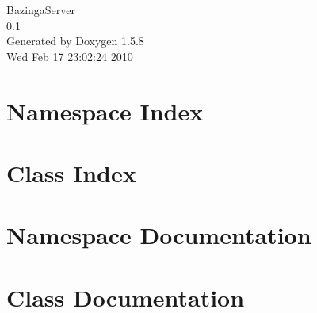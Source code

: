 \documentclass[a4paper]{book}
\begin{document}
\begin{titlepage}
\vspace*{7cm}
\begin{center}
{\Large BazingaServer \\[1ex]\large 0.1 }\\
\vspace*{1cm}
{\large Generated by Doxygen 1.5.8}\\
\vspace*{0.5cm}
{\small Wed Feb 17 23:02:24 2010}\\
\end{center}
\end{titlepage}
\clearemptydoublepage
{}
\tableofcontents
\clearemptydoublepage
{}
\chapter{Namespace Index}

\chapter{Class Index}

\chapter{Namespace Documentation}



\chapter{Class Documentation}














\printindex
\end{document}
